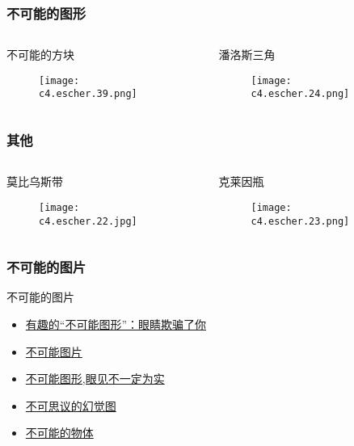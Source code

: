 \begin{frame}
  \frametitle{不可能的图形}
  \begin{columns}
    \begin{block}{不可能的方块}
      \begin{figure}
        \centering
        \texttt{[image: c4.escher.39.png]}
      \end{figure}
    \end{block}
    \begin{block}{潘洛斯三角}
      \begin{figure}
        \centering
        \texttt{[image: c4.escher.24.png]}
      \end{figure}
    \end{block}
  \end{columns}
\end{frame}

\begin{frame}
  \frametitle{其他}
  \begin{columns}
    \begin{block}{莫比乌斯带}
      \begin{figure}
        \centering
        \texttt{[image: c4.escher.22.jpg]}
      \end{figure}
    \end{block}
    \begin{block}{克莱因瓶}
      \begin{figure}
        \centering
        \texttt{[image: c4.escher.23.png]}
      \end{figure}
    \end{block}
  \end{columns}
\end{frame}

\begin{frame}
  \frametitle{不可能的图片}
  \begin{block}{不可能的图片}
    \begin{itemize}
      \item \href{http://news.xinhuanet.com/tech/2009-03/25/content_11072865.htm}{有趣的“不可能图形”：眼睛欺骗了你}
      \item \href{http://www.360doc.com/content/14/0626/17/699582_390050495.shtml}{不可能图片}
      \item \href{http://www.yi2.net/article/201606/13115.html}{不可能图形,眼见不一定为实}
      \item \href{http://yaoyao33.lofter.com/post/bcfa4_70ac2d3}{不可思议的幻觉图}
      \item \href{https://cn.depositphotos.com/vector-images/\%E4\%B8\%8D\%E5\%8F\%AF\%E8\%83\%BD\%E7\%9A\%84\%E7\%89\%A9\%E4\%BD\%93.html}{不可能的物体}
    \end{itemize}
  \end{block}
\end{frame}

